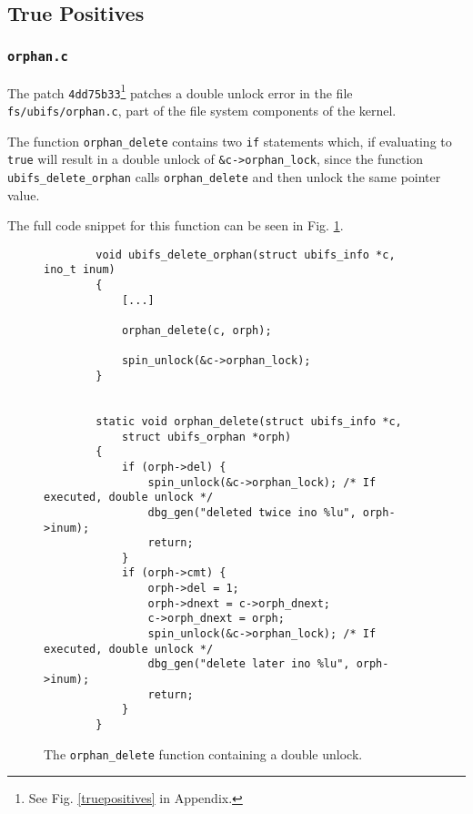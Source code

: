 \subsection{True Positives}

\subsubsection{\texttt{orphan.c}}

\newpar The patch \texttt{4dd75b33}\footnote{See Fig. \ref{truepositives} in Appendix.} patches a double unlock error in the file \texttt{fs/ubifs/orphan.c}, part of the file system components of the kernel.

\newpar The function \texttt{orphan\_delete} contains two \texttt{if} statements which, if evaluating to \texttt{true} will result in a double unlock of \texttt{\&c->orphan\_lock}, since the function \texttt{ubifs\_delete\_orphan} calls \texttt{orphan\_delete} and then unlock the same pointer value. 

\newpar The full code snippet for this function can be seen in Fig. \ref{fig:orphan.c}.

\begin{figure}[H]
    \centering
    \begin{verbatim}
        void ubifs_delete_orphan(struct ubifs_info *c, ino_t inum)
        {
            [...]
            
            orphan_delete(c, orph);

            spin_unlock(&c->orphan_lock);
        }


        static void orphan_delete(struct ubifs_info *c, 
            struct ubifs_orphan *orph)
        {
            if (orph->del) {
                spin_unlock(&c->orphan_lock); /* If executed, double unlock */
                dbg_gen("deleted twice ino %lu", orph->inum);
                return;
            }
            if (orph->cmt) {
                orph->del = 1;
                orph->dnext = c->orph_dnext;
                c->orph_dnext = orph;
                spin_unlock(&c->orphan_lock); /* If executed, double unlock */
                dbg_gen("delete later ino %lu", orph->inum);
                return;
            }
        }
    \end{verbatim}
    \caption{The \texttt{orphan\_delete} function containing a double unlock.}
    \label{fig:orphan.c}
\end{figure}